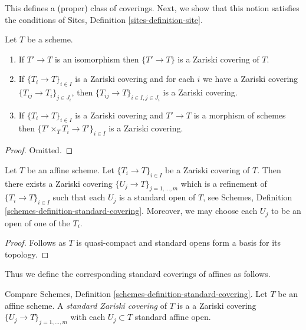 \noindent
This defines a (proper) class of coverings.
Next, we show that this notion satisfies the conditions of
Sites, Definition \ref{sites-definition-site}.

\begin{lemma}
\label{lemma-zariski}
Let $T$ be a scheme.
\begin{enumerate}
\item If $T' \to T$ is an isomorphism then $\{T' \to T\}$
is a Zariski covering of $T$.
\item If $\{T_i \to T\}_{i\in I}$ is a Zariski covering and for each
$i$ we have a Zariski covering $\{T_{ij} \to T_i\}_{j\in J_i}$, then
$\{T_{ij} \to T\}_{i \in I, j\in J_i}$ is a Zariski covering.
\item If $\{T_i \to T\}_{i\in I}$ is a Zariski covering
and $T' \to T$ is a morphism of schemes then
$\{T' \times_T T_i \to T'\}_{i\in I}$ is a Zariski covering.
\end{enumerate}
\end{lemma}

\begin{proof}
Omitted.
\end{proof}

\begin{lemma}
\label{lemma-zariski-affine}
Let $T$ be an affine scheme. Let $\{T_i \to T\}_{i \in I}$ be a
Zariski covering of $T$. Then there exists a Zariski covering
$\{U_j \to T\}_{j = 1, \ldots, m}$ which is a refinement
of $\{T_i \to T\}_{i \in I}$ such that each $U_j$ is a standard
open of $T$, see
Schemes, Definition \ref{schemes-definition-standard-covering}.
Moreover, we may choose each $U_j$ to be an open of one of the $T_i$.
\end{lemma}

\begin{proof}
Follows as $T$ is quasi-compact and standard opens form a basis
for its topology.
\end{proof}

\noindent
Thus we define the corresponding standard coverings of affines as follows.

\begin{definition}
\label{definition-standard-Zariski}
Compare Schemes, Definition \ref{schemes-definition-standard-covering}.
Let $T$ be an affine scheme. A {\it standard Zariski covering}
of $T$ is a a Zariski covering $\{U_j \to T\}_{j = 1, \ldots, m}$
with each $U_j \subset T$ standard affine open.
\end{definition}

